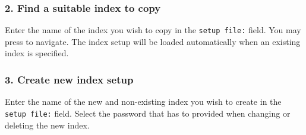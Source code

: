 \documentclass[letterpaper,10pt,twoside,twocolumn,openany]{book}
\begin{document}
\subsubsection{2. Find a suitable index to copy}
Enter the name of the index you wish to copy in the \lstinline!setup file:! field.
You may press  to navigate.
The index setup will be loaded automatically when an existing index is specified.
\subsubsection{3. Create new index setup}
Enter the name of the new and non-existing index you wish to create in the \lstinline!setup file:! field.
Select the password that has to provided when changing or deleting the new index.
\end{document}
